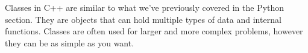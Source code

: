 Classes in C++ are similar to what we've previously covered in the Python section.  They are objects that can hold multiple types of data and internal functions.  Classes are often used for larger and more complex problems, however they can be as simple as you want.
